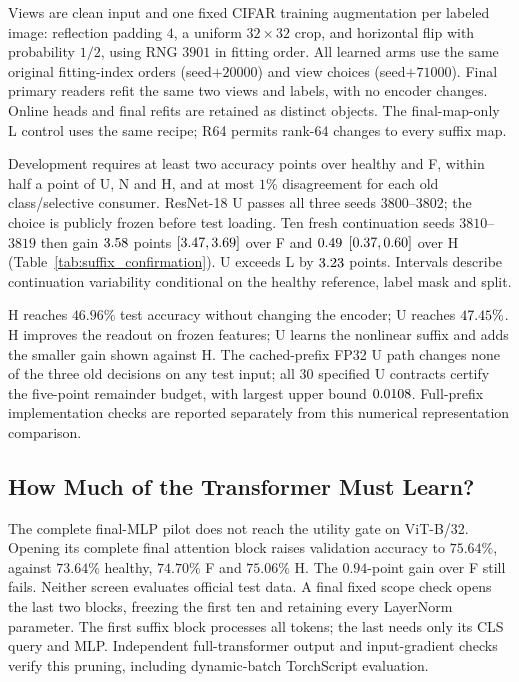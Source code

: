 Views are clean input and one fixed CIFAR training augmentation per labeled
image: reflection padding $4$, a uniform $32\times32$ crop, and horizontal
flip with probability $1/2$, using RNG $3901$ in fitting order. All learned
arms use the same original fitting-index orders (seed$+20000$) and view
choices (seed$+71000$). Final primary readers refit the same two views and
labels, with no encoder changes. Online heads and final refits are retained
as distinct objects. The final-map-only L control uses the same recipe;
R64 permits rank-$64$ changes to every suffix map.

Development requires at least two accuracy points over healthy and F,
within half a point of U, N and H, and at most $1\%$ disagreement for each
old class/selective consumer. ResNet-18 U passes all three seeds
$3800$--$3802$; the choice is publicly frozen before test loading. Ten
fresh continuation seeds $3810$--$3819$ then gain
$3.58$ points $[3.47,3.69]$
over F and $0.49$ $[0.37,0.60]$
over H (Table~\ref{tab:suffix_confirmation}). U exceeds L by
$3.23$ points. Intervals describe continuation variability conditional on the healthy
reference, label mask and split.



H reaches $46.96\%$ test accuracy without changing the encoder; U reaches
$47.45\%$. H improves the readout on frozen features; U learns the nonlinear suffix
and adds the smaller gain shown against H. The cached-prefix FP32 U path changes none of the
three old decisions on any test input; all $30$ specified U contracts certify
the five-point remainder budget, with largest upper bound $0.0108$.
Full-prefix implementation checks are reported separately from this
numerical representation comparison.

\subsection{How Much of the Transformer Must Learn?}\label{app:attention_scope}

The complete final-MLP pilot does not reach the utility gate on ViT-B/32.
Opening its complete final attention block raises validation accuracy to
$75.64\%$, against $73.64\%$ healthy, $74.70\%$ F and $75.06\%$ H. The
$0.94$-point gain over F still fails. Neither screen evaluates official
test data. A final fixed scope check opens the last two blocks, freezing
the first ten and retaining every LayerNorm parameter. The first suffix
block processes all tokens; the last needs only its CLS query and MLP.
Independent full-transformer output and input-gradient checks verify this
pruning, including dynamic-batch TorchScript evaluation.

